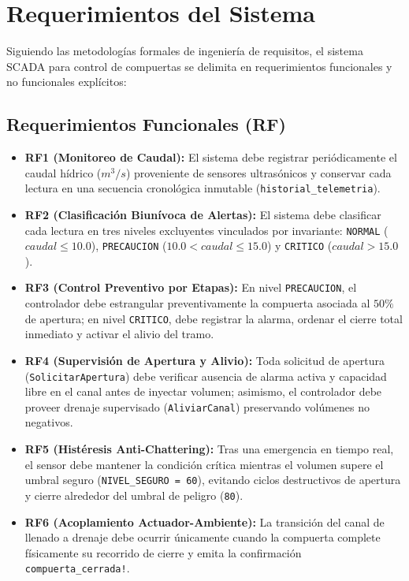 \documentclass[conference]{IEEEtran}
\begin{document}
\section{Requerimientos del Sistema}
Siguiendo las metodologías formales de ingeniería de requisitos, el sistema SCADA para control de compuertas se delimita en requerimientos funcionales y no funcionales explícitos:

\subsection{Requerimientos Funcionales (RF)}
\begin{itemize}
    \item \textbf{RF1 (Monitoreo de Caudal):} El sistema debe registrar periódicamente el caudal hídrico ($m^3/s$) proveniente de sensores ultrasónicos y conservar cada lectura en una secuencia cronológica inmutable (\texttt{historial\_telemetria}).
    \item \textbf{RF2 (Clasificación Biunívoca de Alertas):} El sistema debe clasificar cada lectura en tres niveles excluyentes vinculados por invariante: \texttt{NORMAL} ($caudal \leq 10.0$), \texttt{PRECAUCION} ($10.0 < caudal \leq 15.0$) y \texttt{CRITICO} ($caudal > 15.0$).
    \item \textbf{RF3 (Control Preventivo por Etapas):} En nivel \texttt{PRECAUCION}, el controlador debe estrangular preventivamente la compuerta asociada al $50\%$ de apertura; en nivel \texttt{CRITICO}, debe registrar la alarma, ordenar el cierre total inmediato y activar el alivio del tramo.
    \item \textbf{RF4 (Supervisión de Apertura y Alivio):} Toda solicitud de apertura (\texttt{SolicitarApertura}) debe verificar ausencia de alarma activa y capacidad libre en el canal antes de inyectar volumen; asimismo, el controlador debe proveer drenaje supervisado (\texttt{AliviarCanal}) preservando volúmenes no negativos.
    \item \textbf{RF5 (Histéresis Anti-Chattering):} Tras una emergencia en tiempo real, el sensor debe mantener la condición crítica mientras el volumen supere el umbral seguro (\texttt{NIVEL\_SEGURO = 60}), evitando ciclos destructivos de apertura y cierre alrededor del umbral de peligro (\texttt{80}).
    \item \textbf{RF6 (Acoplamiento Actuador-Ambiente):} La transición del canal de llenado a drenaje debe ocurrir únicamente cuando la compuerta complete físicamente su recorrido de cierre y emita la confirmación \texttt{compuerta\_cerrada!}.
\end{itemize}
\end{document}
